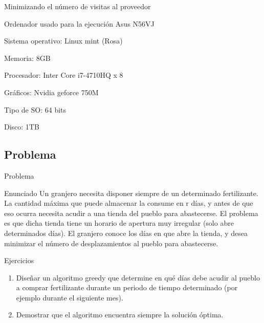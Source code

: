\begin{frame}{Minimizando el número de visitas al proveedor}
\begin{alertblock}{Ordenador usado para la ejecuci\'on}
	Asus N56VJ

	Sistema operativo: Linux mint (Rosa)

	Memoria: 8GB

	Procesador: Inter Core i7-4710HQ x 8

	Gráficos: Nvidia geforce 750M

	Tipo de SO: 64 bits

	Disco: 1TB
	\end{alertblock}
\end{frame}


\subsection{Problema}
\begin{frame}{Problema}
\begin{block}{\small Enunciado}
{\small Un granjero necesita disponer siempre de un determinado fertilizante. La cantidad máxima que puede almacenar la consume en r días, y antes de que eso ocurra necesita acudir a una tienda del pueblo para abastecerse. El problema es que dicha tienda tiene un horario de apertura muy irregular (solo abre determinados días). El granjero conoce los días en que abre la tienda, y desea minimizar el número de desplazamientos al pueblo para abastecerse.}\\
\end{block}

\begin{block}{\small Ejercicios}
\begin{enumerate}
\item {\small Diseñar un algoritmo greedy que determine en qué días debe acudir al pueblo a comprar fertilizante durante un periodo de tiempo determinado (por ejemplo durante el siguiente mes).}\\
\item {\small Demostrar que el algoritmo encuentra siempre la solución  óptima.}\\
\end{enumerate}
\end{block}
\end{frame}


